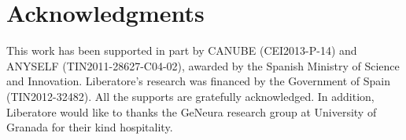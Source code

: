 \documentclass[a4paper]{llncs}
\begin{document}
%
%

\section*{Acknowledgments}
This work has been supported in part by CANUBE (CEI2013-P-14) and ANYSELF (TIN2011-28627-C04-02), awarded by the Spanish Ministry of Science and Innovation. Liberatore's research was financed by the Government of Spain (TIN2012-32482). All the supports are gratefully acknowledged. In addition, Liberatore would like to thanks the GeNeura research group at University of Granada for their kind hospitality.



\end{document}
